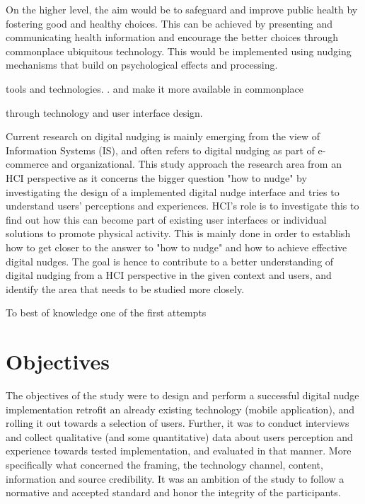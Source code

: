 On the higher level, the aim would be to safeguard and improve public health by fostering good and healthy choices. This can be achieved by presenting and communicating health information and encourage the better choices through commonplace ubiquitous technology. This would be implemented using nudging mechanisms that build on psychological effects and processing. 


tools and technologies. . and make it more available in commonplace 
 
 
 through technology and user interface design. 


Current research on digital nudging is mainly emerging from the view of Information Systems (IS), and often refers to digital nudging as part of e-commerce and organizational. This study approach the research area from an HCI perspective as it concerns the bigger question "how to nudge" by investigating the design of a implemented digital nudge interface and tries to understand users' perceptions and experiences. HCI's role is to investigate this to find out how this can become part of existing user interfaces or individual solutions to promote physical activity. This is mainly done in order to establish how to get closer to the answer to "how to nudge" and how to achieve effective digital nudges. The goal is hence to contribute to a better understanding of digital nudging from a HCI perspective in the given context and users, and identify the area that needs to be studied more closely. 

To best of knowledge one of the first attempts 

\section{Objectives}
The objectives of the study were to design and perform a successful digital nudge implementation retrofit an already existing technology (mobile application), and rolling it out towards a selection of users.
Further, it was to conduct interviews and collect qualitative (and some quantitative) data about users perception and experience towards tested implementation, and evaluated in that manner. More specifically what concerned the framing, the technology channel, content, information and source credibility. It was an ambition of the study to follow a normative and accepted standard and honor the integrity of the participants. 

